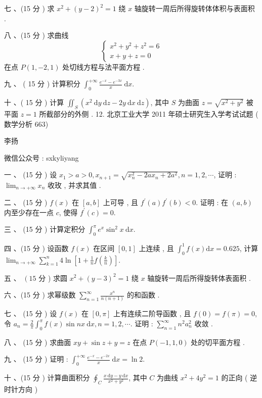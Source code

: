 \documentclass[10pt]{article}
\begin{document}
{ 七 、(15  分 )  求  $x^{2}+(y-2)^{2}=1$  绕  $x$  轴旋转一周后所得旋转体体积与表面积 .

 八 、(15  分 )  求曲线 
$$
\left\{\begin{array}{l}
x^{2}+y^{2}+z^{2}=6 \\
x+y+z=0
\end{array}\right.
$$
 在点  $P(1,-2,1)$  处切线方程与法平面方程 .

 九 、 ( 15  分 )  计算积分  $\int_{0}^{+\infty} \frac{e^{-x}-e^{-3 x}}{x} \mathrm{~d} x$.

 十 、( 15  分 )  计算  $\iint_{S}\left(x^{2} \mathrm{~d} y \mathrm{~d} z-2 y \mathrm{~d} x \mathrm{~d} z\right)$,  其中  $S$  为曲面  $z=\sqrt{x^{2}+y^{2}}$  被平面  $z=1$  所截部分的外侧 . 12.  北京工业大学  2011  年硕士研究生入学考试试题 ( 数学分析 663)

 李扬 

 微信公众号 : sxkyliyang

 一 、 (15  分 )  设  $x_{1}>a>0, x_{n+1}=\sqrt{x_{n}^{2}-2 a x_{n}+2 a^{2}}, n=1,2, \cdots$,  证明 : $\lim _{n \rightarrow+\infty} x_{n}$  收玫 ,  并求其值 .

 二 、 (15  分 ) $f(x)$  在  $[a, b]$  上可导 ,  且  $f^{\prime}(a) f^{\prime}(b)<0$.  证明 :  在  $(a, b)$  内至少存在一点  $c$,  使得  $f^{\prime}(c)=0$.

 三 、 (15  分 )  计算定积分  $\int_{0}^{\pi} e^{x} \sin ^{2} x \mathrm{~d} x$.

 四 、(15  分 )  设函数  $f(x)$  在区间  $[0,1]$  上连续 ,  且  $\int_{0}^{1} f(x) \mathrm{d} x=0.625$,  计算  $\lim _{n \rightarrow+\infty} \sum_{k=1}^{n} 4 \ln \left[1+\frac{1}{n} f\left(\frac{k}{n}\right)\right]$.

 五 、 $\left(15\right.$  分 )  求圆  $x^{2}+(y-3)^{2}=1$  绕  $x$  轴旋转一周后所得旋转体表面积 .

 六 、(15  分 )  求幂级数  $\sum_{n=1}^{\infty} \frac{x^{n}}{n(n+1)}$  的和函数 .

 七 、 (15  分 )  设  $f(x)$  在  $[0, \pi]$  上有连续二阶导函数 ,  且  $f(0)=f(\pi)=0$,  令  $a_{n}=\frac{2}{\pi} \int_{0}^{\pi} f(x) \sin n x \mathrm{~d} x, n=1,2, \cdots$.  证明 : $\sum_{n=1}^{\infty} n^{2} a_{n}^{2}$  收敛 .

 八 、 (15  分 )  求曲面  $x y+\sin z+y=z$  在点  $P(-1,1,0)$  处的切平面方程 .

 九 、 (15  分 )  证明 : $\int_{0}^{+\infty} \frac{e^{-x}-e^{-2 x}}{x} \mathrm{~d} x=\ln 2$.

 十 、(15  分 )  计算曲面积分  $\oint_{C} \frac{x \mathrm{~d} y-y \mathrm{~d} x}{x^{2}+y^{2}}$,  其中  $C$  为曲线  $x^{2}+4 y^{2}=1$  的正向 ( 逆时针方向 )

}
\end{document}
